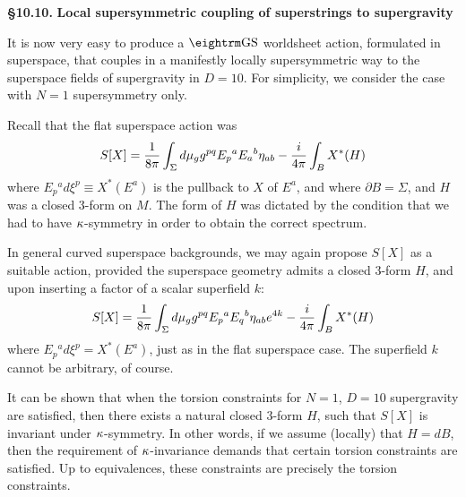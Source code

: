 \bigskip\noindent
{\bf \S 10.10.} {\bf Local supersymmetric coupling of
superstrings to supergravity} 

It is now very easy to produce a $\GS$ worldsheet
action, formulated in superspace, that couples in a
manifestly locally supersymmetric way to the superspace
fields of supergravity in $D=10$.
For simplicity, we consider the case with $N=1$
supersymmetry only.

Recall that the flat superspace action was
$$
S[X]={1\over 8\pi}\int_\Sigma d\mu_g g^{pq}E_p{}^a
E_a{}^b
\eta_{ab}-{i\over 4\pi}\int_B
X^*(H)
$$
where $E_p{}^a d\xi^p\equiv X^*(E^a)$ is the pullback
to $X$ of $E^a$, and where $\partial B=\Sigma$, and $H$
was a closed $3$-form on $M$.
The form of $H$ was dictated by the condition that we
had to have ${\kappa}$-symmetry in order to obtain the correct
spectrum.

In general curved superspace backgrounds, we may again
propose $S[X]$ as a suitable action, provided the
superspace geometry admits a closed $3$-form $H$, and
upon inserting a factor of a scalar superfield $k$:
$$
S[X]={1\over 8\pi}\int_\Sigma d\mu_g
g^{pq}E_p{}^a E_q{}^b\eta_{ab}e^{4k}-{i\over 4\pi}
\int_B X^*(H)
$$
where $E_p{}^a d\xi^p=X^*(E^a)$, just as in the flat
superspace case.
The superfield $k$ cannot be arbitrary, of course.

It can be shown that when the torsion constraints for
$N=1$, $D=10$ supergravity are satisfied, then there
exists a natural closed $3$-form $H$, such that $S[X]$
is invariant under ${\kappa}$-symmetry.
In other words, if we assume (locally) that $H=dB$,
then the requirement of ${\kappa}$-invariance demands that
certain torsion constraints are satisfied.
Up to equivalences, these constraints are precisely the
torsion constraints.


\bye
